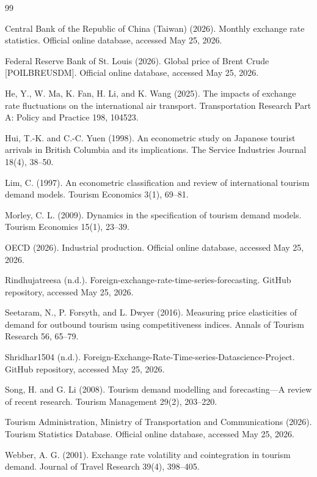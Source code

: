 \documentclass[12pt,a4paper]{article}
\begin{document}
\begin{thebibliography}{99}

Central Bank of the Republic of China (Taiwan) (2026). Monthly exchange rate statistics. Official online database, accessed May 25, 2026.

Federal Reserve Bank of St. Louis (2026). Global price of Brent Crude [POILBREUSDM]. Official online database, accessed May 25, 2026.

He, Y., W. Ma, K. Fan, H. Li, and K. Wang (2025). The impacts of exchange rate fluctuations on the international air transport. Transportation Research Part A: Policy and Practice 198, 104523.

Hui, T.-K. and C.-C. Yuen (1998). An econometric study on Japanese tourist arrivals in British Columbia and its implications. The Service Industries Journal 18(4), 38--50.

Lim, C. (1997). An econometric classification and review of international tourism demand models. Tourism Economics 3(1), 69--81.

Morley, C. L. (2009). Dynamics in the specification of tourism demand models. Tourism Economics 15(1), 23--39.

OECD (2026). Industrial production. Official online database, accessed May 25, 2026.

Rindhujatreesa (n.d.). Foreign-exchange-rate-time-series-forecasting. GitHub repository, accessed May 25, 2026.

Seetaram, N., P. Forsyth, and L. Dwyer (2016). Measuring price elasticities of demand for outbound tourism using competitiveness indices. Annals of Tourism Research 56, 65--79.

Shridhar1504 (n.d.). Foreign-Exchange-Rate-Time-series-Datascience-Project. GitHub repository, accessed May 25, 2026.

Song, H. and G. Li (2008). Tourism demand modelling and forecasting---A review of recent research. Tourism Management 29(2), 203--220.

Tourism Administration, Ministry of Transportation and Communications (2026). Tourism Statistics Database. Official online database, accessed May 25, 2026.

Webber, A. G. (2001). Exchange rate volatility and cointegration in tourism demand. Journal of Travel Research 39(4), 398--405.

\end{thebibliography}
\end{document}
